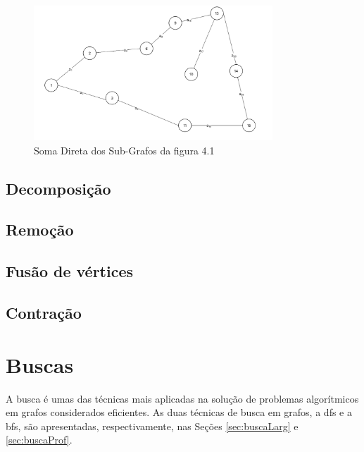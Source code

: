 \documentclass[
12pt,
a4paper,
semrecuonosumario,
sumario = abnt-6027-2012]{report}
\begin{document}
    \begin{figure}[!h]
        \centering
        \includegraphics[width=0.8\textwidth]{figuras/subgrafos/subgrafo_soma_direta.png}
        \caption{Soma Direta dos Sub-Grafos da figura 4.1}
            \label{fig:somaDiretaGrafos}
    \end{figure}


	\section{Decomposição}\label{sec:decomposicao}

	\section{Remoção}\label{sec:remocao}


	\section{Fusão de vértices}\label{sec:fusao}

	\section{Contração}\label{sec:contracao}


	\chapter{Buscas}\label{cap:buscas}

	A busca é umas das técnicas mais aplicadas na solução de problemas algorítmicos em grafos considerados eficientes. As duas técnicas de busca em grafos, a {dfs} e a {bfs}, são apresentadas, respectivamente, nas Seções \ref{sec:buscaLarg} e \ref{sec:buscaProf}.
\end{document}

